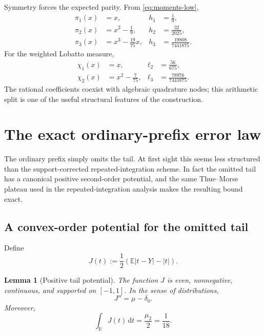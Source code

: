 \documentclass[11pt]{article}
\numberwithin{equation}{section}
\newtheorem{lemma}[theorem]{Lemma}
\theoremstyle{definition}
\theoremstyle{remark}
\newcommand{\R}{\mathbb R}
\newcommand{\E}{\mathbb E}
\newcommand{\dd}{\,\mathrm d}
\newcommand{\abs}[1]{\left|#1\right|}
\begin{document}
Symmetry forces the expected parity.  From \eqref{eq:moments-low},
\begin{align}
 \pi_1(x)&=x,& h_1&=\frac19,\label{eq:pi1}\\
 \pi_2(x)&=x^2-\frac19,& h_2&=\frac{32}{2025},\label{eq:pi2}\\
 \pi_3(x)&=x^3-\frac{19}{75}x,& h_3&=\frac{19808}{7441875}.
 \label{eq:pi3}
\end{align}
For the weighted Lobatto measure,
\begin{align}
 \chi_1(x)&=x,& \ell_2&=\frac{56}{675},\label{eq:chi1}\\
 \chi_2(x)&=x^2-\frac7{75},& \ell_3&=\frac{78976}{7441875}.
 \label{eq:chi2}
\end{align}
The rational coefficients coexist with algebraic quadrature nodes; this arithmetic split is one of the useful structural features of the construction.

\section{The exact ordinary-prefix error law}
\label{sec:ordinary}

The ordinary prefix simply omits the tail.  At first sight this seems less structured than the support-corrected repeated-integration scheme.  In fact the omitted tail has a canonical positive second-order potential, and the same Thue--Morse plateau used in the repeated-integration analysis makes the resulting bound exact.

\subsection{A convex-order potential for the omitted tail}

Define
\begin{equation}
 J(t):=\frac12\left(\E\abs{t-Y}-\abs t\right).
 \label{eq:J-def}
\end{equation}

\begin{lemma}[Positive tail potential]
\label{lem:J}
The function $J$ is even, nonnegative, continuous, and supported on $[-1,1]$.  In the sense of distributions,
\begin{equation}
 J''=\mu-\delta_0.
 \label{eq:J-second}
\end{equation}
Moreover,
\begin{equation}
 \int_{\R}J(t)\dd t=\frac{\mu_2}{2}=\frac1{18}.
 \label{eq:J-mass}
\end{equation}
\end{lemma}
\end{document}
